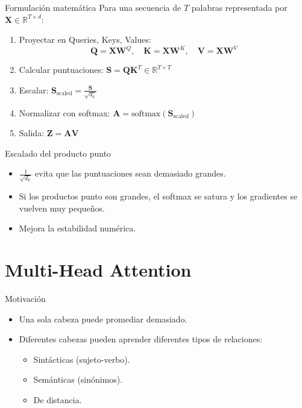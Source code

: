 \documentclass[aspectratio=169, 10pt, xcolor=table]{beamer}
\begin{document}
\begin{frame}{Formulación matemática}
    Para una secuencia de $T$ palabras representada por $\mathbf{X} \in \mathbb{R}^{T \times d}$:
    \begin{enumerate}
        \item Proyectar en Queries, Keys, Values:
        \[
        \mathbf{Q} = \mathbf{X}\mathbf{W}^Q,\quad \mathbf{K} = \mathbf{X}\mathbf{W}^K,\quad \mathbf{V} = \mathbf{X}\mathbf{W}^V
        \]
        \item Calcular puntuaciones: $\mathbf{S} = \mathbf{Q}\mathbf{K}^T \in \mathbb{R}^{T \times T}$
        \item Escalar: $\mathbf{S}_{\text{scaled}} = \frac{\mathbf{S}}{\sqrt{d_k}}$
        \item Normalizar con softmax: $\mathbf{A} = \text{softmax}(\mathbf{S}_{\text{scaled}})$
        \item Salida: $\mathbf{Z} = \mathbf{A}\mathbf{V}$
    \end{enumerate}
\end{frame}

\begin{frame}{Escalado del producto punto}
    \begin{itemize}
        \item $\frac{1}{\sqrt{d_k}}$ evita que las puntuaciones sean demasiado grandes.
        \item Si los productos punto son grandes, el softmax se satura y los gradientes se vuelven muy pequeños.
        \item Mejora la estabilidad numérica.
    \end{itemize}
\end{frame}

\section{Multi-Head Attention}

\begin{frame}{Motivación}
    \begin{itemize}
        \item Una sola cabeza puede promediar demasiado.
        \item Diferentes cabezas pueden aprender diferentes tipos de relaciones:
        \begin{itemize}
            \item Sintácticas (sujeto-verbo).
            \item Semánticas (sinónimos).
            \item De distancia.
        \end{itemize}
    \end{itemize}
\end{frame}
\end{document}
